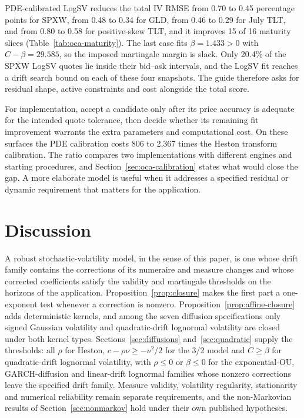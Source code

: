 \documentclass[11pt,a4paper]{article}
\theoremstyle{definition}
\theoremstyle{remark}
\newcommand{\rmseHestonSPXW}{0.70}
\newcommand{\rmseLogSVSPXW}{0.45}
\newcommand{\insideLogSVSPXW}{20.4}
\newcommand{\rmseHestonGLD}{0.48}
\newcommand{\rmseLogSVGLD}{0.34}
\newcommand{\rmseHestonTLT}{0.46}
\newcommand{\rmseLogSVTLT}{0.29}
\newcommand{\rmseHestonTLTpositive}{0.80}
\newcommand{\rmseLogSVTLTpositive}{0.58}
\newcommand{\fitRatioMax}{2,367}
\newcommand{\fitRatioMin}{806}
\newcommand{\improvedSlices}{15}
\newcommand{\totalSlices}{16}
\newcommand{\positiveBeta}{1.433}
\newcommand{\positiveMargin}{29.585}
\begin{document}
PDE-calibrated LogSV reduces the total IV RMSE from \rmseHestonSPXW{} to \rmseLogSVSPXW{} percentage points for SPXW, from \rmseHestonGLD{} to \rmseLogSVGLD{} for GLD, from \rmseHestonTLT{} to \rmseLogSVTLT{} for July TLT, and from \rmseHestonTLTpositive{} to \rmseLogSVTLTpositive{} for positive-skew TLT, and it improves \improvedSlices{} of \totalSlices{} maturity slices (Table~\ref{tab:oca-maturity}). The last case fits $\beta=\positiveBeta>0$ with $C-\beta=\positiveMargin$, so the imposed martingale margin is slack. Only \insideLogSVSPXW\% of the SPXW LogSV quotes lie inside their bid--ask intervals, and the LogSV fit reaches a drift search bound on each of these four snapshots. The guide therefore asks for residual shape, active constraints and cost alongside the total score.

For implementation, accept a candidate only after its price accuracy is adequate for the intended quote tolerance, then decide whether its remaining fit improvement warrants the extra parameters and computational cost. On these surfaces the PDE calibration costs \fitRatioMin{} to \fitRatioMax{} times the Heston transform calibration. The ratio compares two implementations with different engines and starting procedures, and Section~\ref{sec:oca-calibration} states what would close the gap. A more elaborate model is useful when it addresses a specified residual or dynamic requirement that matters for the application.

\section{Discussion}
\label{sec:discussion}

A robust stochastic-volatility model, in the sense of this paper, is one whose drift family contains the corrections of its numeraire and measure changes and whose corrected coefficients satisfy the validity and martingale thresholds on the horizons of the application. Proposition~\ref{prop:closure} makes the first part a one-exponent test whenever a correction is nonzero. Proposition~\ref{prop:affine-closure} adds deterministic kernels, and among the seven diffusion specifications only signed Gaussian volatility and quadratic-drift lognormal volatility are closed under both kernel types. Sections~\ref{sec:diffusions} and~\ref{sec:quadratic} supply the thresholds: all \(\rho\) for Heston, \(c-\rho\nu\geq-\nu^2/2\) for the 3/2 model and \(C\geq\beta\) for quadratic-drift lognormal volatility, with \(\rho\leq0\) or \(\beta\leq0\) for the exponential-OU, GARCH-diffusion and linear-drift lognormal families whose nonzero corrections leave the specified drift family. Measure validity, volatility regularity, stationarity and numerical reliability remain separate requirements, and the non-Markovian results of Section~\ref{sec:nonmarkov} hold under their own published hypotheses.
\end{document}

